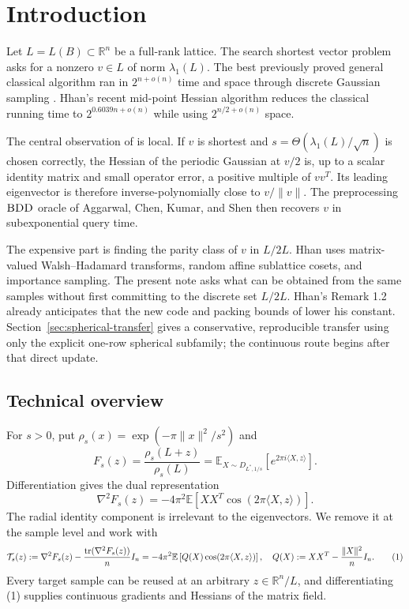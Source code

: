 \documentclass[10pt]{article}
\theoremstyle{definition}
\newcommand{\R}{\mathbb{R}}
\newcommand{\E}{\mathbb{E}}
\newcommand{\tr}{\mathop{\rm tr}}
\newcommand{\BDD}{\textnormal{\textsc{BDD}}}
\newcommand{\Torus}{\R^n/L}
\newcommand{\ip}[2]{\langle #1,#2\rangle}
\newcommand{\norm}[1]{\lVert #1\rVert}
\newcommand{\cT}{\mathcal{T}}
\begin{document}
\tableofcontents

\section{Introduction}

Let $L=L(B)\subset\R^n$ be a full-rank lattice.  The search shortest vector
problem asks for a nonzero $v\in L$ of norm $\lambda_1(L)$.  The best
previously proved general classical algorithm ran in $2^{n+o(n)}$ time and
space through discrete Gaussian sampling \cite{ADRS15}.  Hhan's recent
mid-point Hessian algorithm \cite{Hhan26} reduces the classical running time
to $2^{0.6039n+o(n)}$ while using $2^{n/2+o(n)}$ space.

The central observation of \cite{Hhan26} is local.  If $v$ is shortest and
$s=\Theta(\lambda_1(L)/\sqrt n)$ is chosen correctly, the Hessian of the
periodic Gaussian at $v/2$ is, up to a scalar identity matrix and small
operator error, a positive multiple of $vv^T$.  Its leading eigenvector is
therefore inverse-polynomially close to $v/\norm v$.  The preprocessing
$\BDD$ oracle of Aggarwal, Chen, Kumar, and Shen \cite{ACKS25} then recovers
$v$ in subexponential query time.

The expensive part is finding the parity class of $v$ in $L/2L$.  Hhan uses
matrix-valued Walsh--Hadamard transforms, random affine sublattice cosets, and
importance sampling.  The present note asks what can be obtained from the
same samples without first committing to the discrete set $L/2L$.
Hhan's Remark 1.2 already anticipates that the new code and packing bounds of
\cite{OpenAI26} lower his constant.  Section~\ref{sec:spherical-transfer}
gives a conservative, reproducible transfer using only the explicit one-row
spherical subfamily; the continuous route begins after that direct update.

\subsection{Technical overview}

For $s>0$, put $\rho_s(x)=\exp(-\pi\norm{x}^2/s^2)$ and
\[
 F_s(z)=\frac{\rho_s(L+z)}{\rho_s(L)}
      =\E_{X\sim D_{L^*,1/s}}\!\left[e^{2\pi i\ip Xz}\right].
\]
Differentiation gives the dual representation
\[
 \nabla^2 F_s(z)
   =-4\pi^2\E\left[XX^T\cos(2\pi\ip Xz)\right].
\]
The radial identity component is irrelevant to the eigenvectors.  We remove
it at the sample level and work with
\[
 \cT_s(z):=\nabla^2F_s(z)-\frac{\tr(\nabla^2F_s(z))}{n}I_n
 =-4\pi^2\E\left[Q(X)\cos(2\pi\ip Xz)\right],
 \quad
 Q(X):=XX^T-\frac{\norm X^2}{n}I_n.                 \tag{1}
\]
Every target sample can be reused at an arbitrary $z\in\Torus$, and
differentiating (1) supplies continuous gradients and Hessians of the matrix
field.
\end{document}

